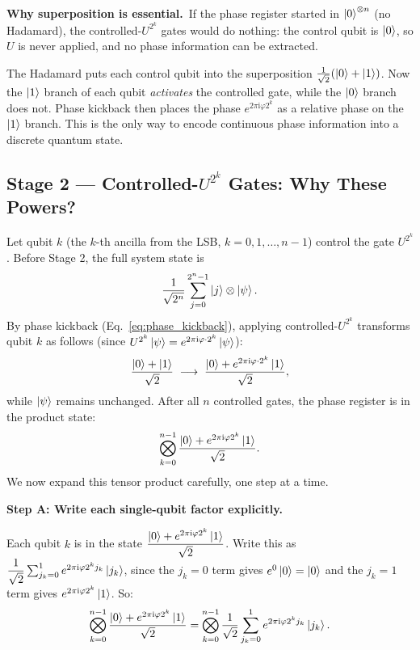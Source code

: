 \documentclass[12pt,a4paper]{article}
\newcommand{\ii}{\mathrm{i}}
\begin{document}
\begin{tcolorbox}[insight]
  \textbf{Why superposition is essential.}\ If the phase register
  started in $\Ket{0}^{\otimes n}$ (no Hadamard), the controlled-$U^{2^k}$
  gates would do nothing: the control qubit is $\Ket{0}$, so $U$ is never
  applied, and no phase information can be extracted.

  The Hadamard puts each control qubit into the superposition
  $\tfrac{1}{\sqrt{2}}(\Ket{0}+\Ket{1})$.  Now the $\Ket{1}$ branch of
  each qubit \emph{activates} the controlled gate, while the $\Ket{0}$
  branch does not.  Phase kickback then places the phase $e^{2\pi\ii\varphi 2^k}$
  as a relative phase on the $\Ket{1}$ branch.  This is the only way to
  encode continuous phase information into a discrete quantum state.
\end{tcolorbox}

\subsection{Stage 2 --- Controlled-\texorpdfstring{$U^{2^k}$}{U^{}2^{}k} Gates: Why These Powers?}
\label{subsec:stage2}

Let qubit $k$ (the $k$-th ancilla from the LSB, $k=0,1,\ldots,n-1$) control
the gate $U^{2^k}$.  Before Stage 2, the full system state is
\[
  \frac{1}{\sqrt{2^n}}\sum_{j=0}^{2^n-1}\Ket{j}\otimes\Ket{\psi}.
\]
By phase kickback (Eq.~\eqref{eq:phase_kickback}), applying controlled-$U^{2^k}$
transforms qubit $k$ as follows (since $U^{2^k}\Ket{\psi} = e^{2\pi\ii\varphi\cdot 2^k}\Ket{\psi}$):
\[
  \frac{\Ket{0}+\Ket{1}}{\sqrt{2}}
  \;\longrightarrow\;
  \frac{\Ket{0}+e^{2\pi \ii \varphi \cdot 2^k}\Ket{1}}{\sqrt{2}},
\]
while $\Ket{\psi}$ remains unchanged.  After all $n$ controlled gates, the
phase register is in the product state:
\[
  \bigotimes_{k=0}^{n-1}\frac{\Ket{0}+e^{2\pi \ii \varphi 2^k}\Ket{1}}{\sqrt{2}}.
\]
We now expand this tensor product carefully, one step at a time.

\medskip
\noindent\textbf{Step A: Write each single-qubit factor explicitly.}

Each qubit $k$ is in the state $\dfrac{\Ket{0}+e^{2\pi\ii\varphi 2^k}\Ket{1}}{\sqrt{2}}$.
Write this as $\dfrac{1}{\sqrt{2}}\sum_{j_k=0}^{1} e^{2\pi\ii\varphi 2^k j_k}\Ket{j_k}$,
since the $j_k=0$ term gives $e^0\Ket{0}=\Ket{0}$ and the $j_k=1$ term gives
$e^{2\pi\ii\varphi 2^k}\Ket{1}$. So:
\[
  \bigotimes_{k=0}^{n-1}\frac{\Ket{0}+e^{2\pi \ii \varphi 2^k}\Ket{1}}{\sqrt{2}}
  = \bigotimes_{k=0}^{n-1} \frac{1}{\sqrt{2}}\sum_{j_k=0}^{1} e^{2\pi\ii\varphi 2^k j_k}\Ket{j_k}.
\]
\end{document}
